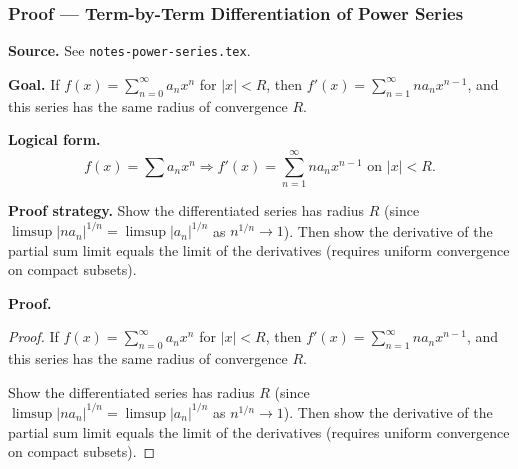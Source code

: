 

\clearpage
{}
\hypertarget{proof-RA-ABB-T-termbyterm-diff}{}

\subsubsection[Term-by-Term Differentiation of Power Series]{Proof --- Term-by-Term Differentiation of Power Series}

\bigskip

\noindent
\textbf{Source.} See \texttt{notes-power-series.tex}.

\vspace{0.75em}

\noindent
\textbf{Goal.} If $f(x) = \sum_{n=0}^\infty a_n x^n$ for $|x| < R$, then $f'(x) = \sum_{n=1}^\infty n a_n x^{n-1}$, and this series has the same radius of convergence $R$.

\vspace{0.75em}

\noindent
\textbf{Logical form.}
\[
  f(x) = \sum a_n x^n \Rightarrow f'(x) = \sum_{n=1}^\infty n a_n x^{n-1} \text{ on } |x| < R.
\]

\vspace{0.75em}

\noindent
\textbf{Proof strategy.} Show the differentiated series has radius $R$ (since $\limsup |n a_n|^{1/n} = \limsup |a_n|^{1/n}$ as $n^{1/n} \to 1$). Then show the derivative of the partial sum limit equals the limit of the derivatives (requires uniform convergence on compact subsets).

\vspace{0.75em}

\noindent
\textbf{Proof.}
\begin{proof}
\Claim If $f(x) = \sum_{n=0}^\infty a_n x^n$ for $|x| < R$, then $f'(x) = \sum_{n=1}^\infty n a_n x^{n-1}$, and this series has the same radius of convergence $R$.

\Given 

\Goal 

\Strategy Show the differentiated series has radius $R$ (since $\limsup |n a_n|^{1/n} = \limsup |a_n|^{1/n}$ as $n^{1/n} \to 1$). Then show the derivative of the partial sum limit equals the limit of the derivatives (requires uniform convergence on compact subsets).

\medskip


\end{proof}


